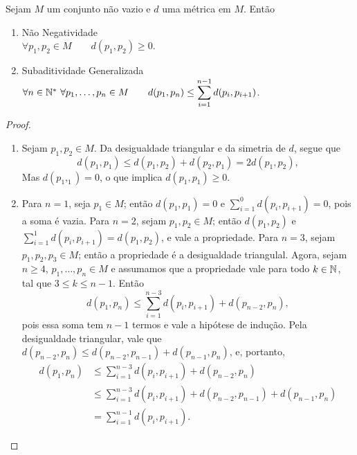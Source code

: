 \begin{prop}
	Sejam $M$ um conjunto não vazio e $d$ uma métrica em $M$. Então
	\begin{enumerate}
	\item Não Negatividade \\
	$\forall p_1,p_2 \in M \qquad d(p_1,p_2) \geq 0$.
	\item Subaditividade Generalizada \\
	$\forall n \in \mathbb{N}^* \ \forall p_1,\ldots,p_n \in M \qquad d(p_1,p_n) \leq \displaystyle\sum_{i=1}^{n-1} d(p_i,p_{i+1})$.
	\end{enumerate}
\end{prop}
\begin{proof}
	\begin{enumerate}
	\item Sejam $p_1,p_2 \in M$. Da desigualdade triangular e da simetria de $d$, segue que
	\begin{equation*}
	d(p_1,p_1) \leq d (p_1,p_2)+d(p_2,p_1)= 2 d(p_1,p_2),
	\end{equation*}
Mas $d(p_1,_1) = 0$, o que implica $d(p_1,p_1) \geq 0$.
	\item Para $n=1$, seja $p_1 \in M$; então $d(p_1,p_1)=0$ e $\sum_{i=1}^{0} d(p_i,p_{i+1})=0$, pois a soma é vazia. Para $n=2$, sejam $p_1,p_2 \in M$; então $d(p_1,p_2)$ e $\sum_{i=1}^{1} d(p_i,p_{i+1})=d(p_1,p_2)$, e vale a propriedade. Para $n=3$, sejam $p_1,p_2,p_3 \in M$; então a propriedade é a desigualdade triangulal. Agora, sejam $n \geq 4$, $p_1,\ldots,p_n \in M$ e assumamos que a propriedade vale para todo $k \in \mathbb{N}$, tal que $3 \leq k \leq n-1$. Então
	\begin{equation*}
	d(p_1,p_n) \leq \sum_{i=1}^{n-3} d(p_i,p_{i+1})+d(p_{n-2},p_n),
	\end{equation*}
pois essa soma tem $n-1$ termos e vale a hipótese de indução. Pela desigualdade triangular, vale que $d(p_{n-2},p_n) \leq d(p_{n-2},p_{n-1})+d(p_{n-1},p_n)$, e, portanto,
	\begin{align*}
	d(p_1,p_n) &\leq \sum_{i=1}^{n-3} d(p_i,p_{i+1})+d(p_{n-2},p_n)\\
			&\leq \sum_{i=1}^{n-3} d(p_i,p_{i+1}) + d(p_{n-2},p_{n-1})+d(p_{n-1},p_n) \\
			&= \sum_{i=1}^{n-1} d(p_i,p_{i+1}).
	\end{align*}
	\end{enumerate}
\end{proof}

